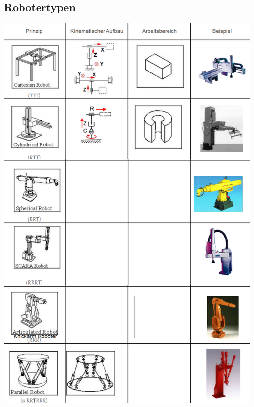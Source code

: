 \begin{minipage}{0.5\linewidth}
    \subsection{Robotertypen}
    \includegraphics[width=\linewidth]{./bilder/RoboTypen}
\end{minipage}

